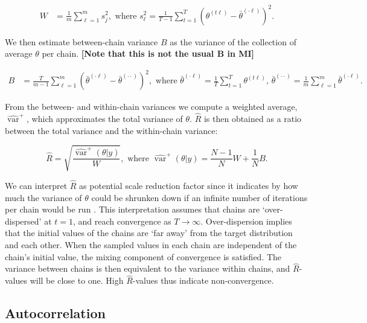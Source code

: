\documentclass[Royal,times,sageh]{sagej}
\begin{document}
\begin{align*}
W&=\frac{1}{m} \sum_{\ell=1}^{m} s_{j}^{2}, \text { where } s_{\ell}^{2}=\frac{1}{T-1} \sum_{t=1}^{T}\left(\theta^{(t \ell)}-\bar{\theta}^{(\cdot \ell)}\right)^{2}. 
\end{align*}

\noindent We then estimate between-chain variance \(B\) as the variance of the collection of average \(\theta\) per chain. \textbf{{[}Note that this is not the usual B in MI{]}}

\begin{align*}
B&=\frac{T}{m-1} \sum_{\ell=1}^{m}\left(\bar{\theta}^{(\cdot \ell)}-\bar{\theta}^{(\cdot \cdot)}\right)^{2}, \text { where } \bar{\theta}^{(\cdot \ell)}=\frac{1}{T} \sum_{t=1}^{T} \theta^{(t \ell)} \text{, } \bar{\theta}^{(\cdot \cdot)}=\frac{1}{m} \sum_{\ell=1}^{m} \bar{\theta}^{(\cdot \ell)}. 
\end{align*}

\noindent From the between- and within-chain variances we compute a weighted average, \(\widehat{\operatorname{var}}^{+}\), which approximates the total variance of \(\theta\). \(\widehat{R}\) is then obtained as a ratio between the total variance and the within-chain variance:

\begin{equation*}
\widehat{R}=\sqrt{\frac{\widehat{\operatorname{var}}^{+}(\theta | y)}{W}},
\text{ where } \widehat{\operatorname{var}}^{+}(\theta | y)=\frac{N-1}{N} W+\frac{1}{N} B.
\end{equation*}

We can interpret \(\widehat{R}\) as potential scale reduction factor since it indicates by how much the variance of \(\theta\) could be shrunken down if an infinite number of iterations per chain would be run \citep{gelm92}. This interpretation assumes that chains are `over-dispersed' at \(t=1\), and reach convergence as \(T \to \infty\). Over-dispersion implies that the initial values of the chains are `far away' from the target distribution and each other. When the sampled values in each chain are independent of the chain's initial value, the mixing component of convergence is satisfied. The variance between chains is then equivalent to the variance within chains, and \(\widehat{R}\)-values will be close to one. High \(\widehat{R}\)-values thus indicate non-convergence.

\hypertarget{autocorrelation}{%
\subsection{Autocorrelation}\label{autocorrelation}}
\end{document}
